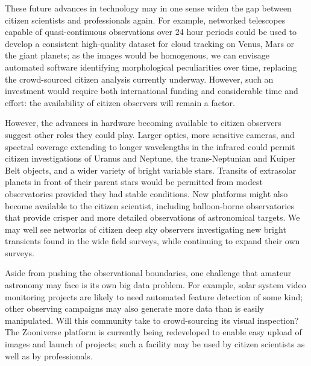 \documentclass{ar2e}
\begin{document}
These future advances in technology may in one sense widen the gap between
citizen scientists and professionals again. For example, networked telescopes
capable of quasi-continuous observations over 24 hour periods could be used to
develop a consistent high-quality dataset for cloud tracking on Venus, Mars or
the giant planets; as the images would be homogenous, we can envisage automated
software identifying morphological peculiarities over time, replacing the
crowd-sourced citizen analysis currently underway.  However, such an investment
would require both international funding and considerable time and effort: the
availability of citizen observers will remain a factor.




However, the advances in hardware becoming available to citizen observers
suggest other roles they could play. Larger optics, more sensitive cameras, and
spectral coverage extending to longer wavelengths in the infrared could permit
citizen investigations of Uranus and Neptune, the trans-Neptunian and Kuiper
Belt objects, and a wider variety of bright variable stars.  Transits of
extrasolar planets in front of their parent stars would be permitted from modest
observatories provided they had stable conditions.  New platforms might also
become available to the citizen scientist, including balloon-borne observatories
that provide crisper and more detailed observations of astronomical targets. We
may well see networks of citizen deep sky observers investigating new bright
transients found in the wide field surveys,  while continuing to expand their
own surveys.

Aside from pushing the observational boundaries, one challenge that amateur
astronomy may face is its own big data problem.   For example, solar system
video monitoring projects are likely to need automated feature detection of some
kind; other observing campaigns may also generate more data than is easily
manipulated. Will this community take to crowd-sourcing its visual inspection?
The Zooniverse platform is currently being redeveloped to enable easy upload of images
and launch of projects; such a facility may be used by citizen scientists as well as by 
professionals. 

\end{document}
